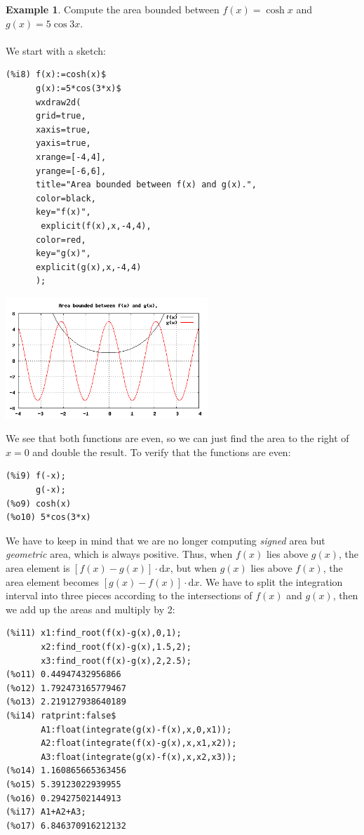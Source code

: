 \documentclass[10.5pt,twoside]{report}
\theoremstyle{definition}
\newtheorem{exmp}{Example}[section]
\begin{document}
\begin{exmp}  Compute the area bounded between $f(x)=\cosh{x}$ and $g(x)=5 \cos{3x}$.\\
${}$\\
We start with a sketch:

\begin{verbatim}
(%i8) f(x):=cosh(x)$
      g(x):=5*cos(3*x)$
      wxdraw2d(
      grid=true,
      xaxis=true,
      yaxis=true,
      xrange=[-4,4], 
      yrange=[-6,6],
      title="Area bounded between f(x) and g(x).",
      color=black,
      key="f(x)",
       explicit(f(x),x,-4,4),
      color=red,
      key="g(x)",
      explicit(g(x),x,-4,4)
      );
\end{verbatim}

\includegraphics[width=3in]{example_3_1_3_1}

We see that both functions are even, so we can just find the area to the right of $x=0$ and double the result.  To verify that the functions are even:

\begin{verbatim}
(%i9) f(-x);
      g(-x);
(%o9) cosh(x)
(%o10) 5*cos(3*x)
\end{verbatim}

We have to keep in mind that we are no longer computing \textit{signed} area but \textit{geometric} area, which is always positive.  Thus, when $f(x)$ lies above $g(x)$, the area element is $[f(x)-g(x)]\cdot \mathrm{d}x$, but when $g(x)$ lies above $f(x)$, the area element becomes $[g(x)-f(x)]\cdot \mathrm{d}x$.  We have to split the integration interval into three pieces according to the intersections of $f(x)$ and $g(x)$, then we add up the areas and multiply by 2:

\begin{verbatim}
(%i11) x1:find_root(f(x)-g(x),0,1);
       x2:find_root(f(x)-g(x),1.5,2);
       x3:find_root(f(x)-g(x),2,2.5);
(%o11) 0.44947432956866
(%o12) 1.792473165779467
(%o13) 2.219127938640189
(%i14) ratprint:false$
       A1:float(integrate(g(x)-f(x),x,0,x1));
       A2:float(integrate(f(x)-g(x),x,x1,x2));
       A3:float(integrate(g(x)-f(x),x,x2,x3));
(%o14) 1.160865665363456
(%o15) 5.39123022939955
(%o16) 0.29427502144913
(%i17) A1+A2+A3;
(%o17) 6.846370916212132


\end{verbatim}
\end{exmp}
\end{document}
